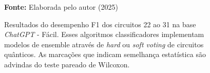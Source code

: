 \begin{figure}
\caption{Resultados do desempenho F1 dos circuitos 22 ao 31 na base \textit{ChatGPT} - Fácil. Esses algoritmos classificadores implementam modelos de ensemble através de \textit{hard} ou \textit{soft voting} de circuitos quânticos. As marcações que indicam semelhança estatística são advindas do teste pareado de Wilcoxon.}
\label{fig:f1:easy:g7}
     \centering
    \centering

      \par\medskip\ABNTEXfontereduzida\selectfont\textbf{Fonte:} Elaborada pelo autor (2025) \par\medskip
\end{figure}
